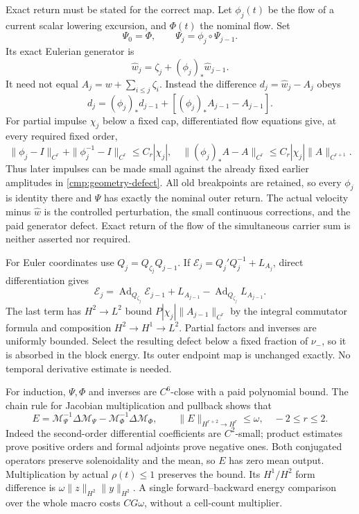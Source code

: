 \documentclass[11pt,a4paper]{amsart}
\theoremstyle{definition}
\theoremstyle{remark}
\numberwithin{equation}{section}
\begin{document}
Exact return must be stated for the correct map. Let $\phi_j(t)$ be the
flow of a current scalar lowering excursion, and $\Phi(t)$ the nominal
flow. Set
\[
 \Psi_0=\Phi,\qquad\Psi_j=\phi_j\circ\Psi_{j-1}.
\]
Its exact Eulerian generator is
\begin{equation}
 \widehat w_j=\zeta_j+(\phi_j)_*\widehat w_{j-1}.
 \label{cmp:geometry-generator}
\end{equation}
It need not equal $A_j=w+\sum_{i\le j}\zeta_i$. Instead the difference
$d_j=\widehat w_j-A_j$ obeys
\begin{equation}
 d_j=(\phi_j)_*d_{j-1}+[(\phi_j)_*A_{j-1}-A_{j-1}].
 \label{cmp:geometry-defect}
\end{equation}
For partial impulse $\chi_j$ below a fixed cap, differentiated flow equations
give, at every required fixed order,
\[
 \|\phi_j-I\|_{C^r}+\|\phi_j^{-1}-I\|_{C^r}\le C_r|\chi_j|,
 \quad
 \|(\phi_j)_*A-A\|_{C^r}\le C_r|\chi_j|\|A\|_{C^{r+1}}.
\]
Thus later impulses can be made small against the already fixed earlier
amplitudes in \eqref{cmp:geometry-defect}. All old breakpoints are retained,
so every $\phi_j$ is identity there and $\Psi$ has exactly the nominal
outer return. The actual velocity minus $\widehat w$ is the controlled
perturbation, the small continuous corrections, and the paid generator
defect. Exact return of the flow of the simultaneous carrier sum is neither
asserted nor required.

For Euler coordinates use $Q_j=Q_{\zeta_j}Q_{j-1}$. If
$\mathcal E_j=Q_j'Q_j^{-1}+L_{A_j}$, direct differentiation gives
\begin{equation}
 \mathcal E_j=\operatorname{Ad}_{Q_{\zeta_j}}\mathcal E_{j-1}
               +L_{A_{j-1}}-\operatorname{Ad}_{Q_{\zeta_j}}L_{A_{j-1}}.
 \label{cmp:euler-defect}
\end{equation}
The last term has $H^2\to L^2$ bound
$P|\chi_j|\|A_{j-1}\|_{C^r}$ by the integral commutator formula and
composition $H^2\to H^1\to L^2$. Partial factors and inverses are uniformly
bounded. Select the resulting defect below a fixed fraction of $\nu_-$,
so it is absorbed in the block energy. Its outer endpoint map is unchanged
exactly. No temporal derivative estimate is needed.

For induction, $\Psi,\Phi$ and inverses are $C^6$-close with a paid
polynomial bound. The chain rule for Jacobian multiplication and pullback
shows that
\begin{equation}
 E=\mathcal M_\Psi^{-1}\Delta\mathcal M_\Psi
                  -\mathcal M_\Phi^{-1}\Delta\mathcal M_\Phi,
 \qquad \|E\|_{H^{r+2}\to H^r}\le\omega,\quad -2\le r\le2.
 \label{cmp:signed-defect}
\end{equation}
Indeed the second-order differential coefficients are $C^2$-small; product
estimates prove positive orders and formal adjoints prove negative ones.
Both conjugated operators preserve solenoidality and the mean, so $E$ has
zero mean output. Multiplication by actual $\rho(t)\le1$ preserves the
bound. Its $H^1/H^2$ form difference is
$\omega\|z\|_{H^2}\|y\|_{H^2}$. A single forward--backward energy comparison
over the whole macro costs $CG\omega$, without a cell-count multiplier.
\end{document}
